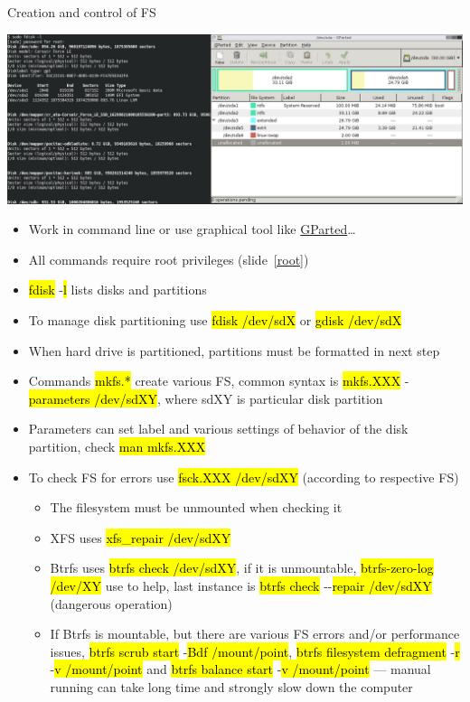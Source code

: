 \documentclass[compress, ucs, xelatex, 11pt, xcolor=svgnames, aspectratio=169,
	hyperref={
		bookmarks=true,
		unicode=true,
		colorlinks=true,
		pdftitle={Linux, command line and MetaCentrum},
		plainpages=false,
		pdfauthor={Vojtech Zeisek},
		pdfsubject={Course about use of Linux command line, writing shell scripts and using MetaCentrum of CESNET},
		pdfcreator={XeLaTeX},
		pdfkeywords={Linux, GNU, BASH, shell, command line, MetaCentrum},
		linkcolor=DarkRed, %
		anchorcolor=DarkBlue, %
		citecolor=Indigo, %
		filecolor=NavyBlue, %
		menucolor=DarkMagenta, %
		urlcolor=DarkBlue, %
		pdftex},
	url={hyphens, lowtilde} %
	]{beamer}
\renewcommand{\texttt}[1]{\hl{\ttfamily #1}}
\begin{document}
\begin{frame}[allowframebreaks]{Creation and control of FS}
	\begin{center}
		\includegraphics[width=\textwidth]{disks.png}
	\end{center}
	\begin{itemize}
		\item Work in command line or use graphical tool like \href{https://gparted.org/}{GParted}\ldots
		\item All commands require root privileges (slide~\ref{root})
		\item \texttt{fdisk} -\texttt{l} lists disks and partitions
		\item To manage disk partitioning use \texttt{fdisk /dev/sdX} or \texttt{gdisk /dev/sdX}
		\item When hard drive is partitioned, partitions must be formatted in next step
		\item Commands \texttt{mkfs.*} create various FS, common syntax is \texttt{mkfs.XXX} -\texttt{parameters /dev/sdXY}, where sdXY is particular disk partition
		\item Parameters can set label and various settings of behavior of the disk partition, check \texttt{man mkfs.XXX}
		\item To check FS for errors use \texttt{fsck.XXX /dev/sdXY} (according to respective FS)
		\begin{itemize}
			\item The filesystem must be unmounted when checking it
			\item XFS uses \texttt{xfs\_repair /dev/sdXY}
			\item Btrfs uses \texttt{btrfs check /dev/sdXY}, if it is unmountable, \texttt{btrfs-zero-log /dev/XY} use to help, last instance is \texttt{btrfs check} -{-}\texttt{repair /dev/sdXY} (dangerous operation)
			\item If Btrfs is mountable, but there are various FS errors and/or performance issues, \texttt{btrfs scrub start} -\texttt{Bdf /mount/point}, \texttt{btrfs filesystem defragment} -\texttt{r} -\texttt{v /mount/point} and \texttt{btrfs balance start} -\texttt{v /mount/point} --- manual running can take long time and strongly slow down the computer

\end{itemize}
\end{itemize}
\end{frame}
\end{document}
